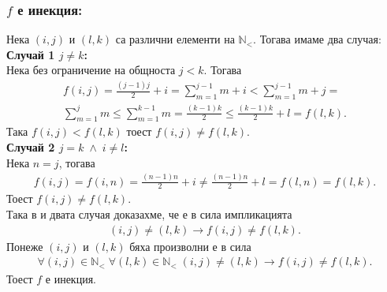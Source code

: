 \documentclass[a4paper, 12pt, oneside]{article}
\newcommand{\N}{\mathbb{N}}
\newcommand{\LN}{\N_<}
\begin{document}
\subsubsection*{\(f\) е инекция:}
Нека \((i, j)\) и \((l, k)\) са различни елементи на \(\LN\).
Тогава имаме два случая: \\
\textbf{Случай 1 \(j \neq k\):} \\
Нека без ограничение на общноста \(j < k\). Тогава
\begin{align*}
    f(i, j) = \displaystyle\frac{(j - 1)j}{2} + i = \displaystyle\sum_{m = 1}^{j - 1} m  + i < \displaystyle\sum_{m = 1}^{j - 1} m + j = \\
    \displaystyle\sum_{m = 1}^j m \leq \displaystyle\sum_{m = 1}^{k - 1} m = \displaystyle\frac{(k - 1)k}{2} \leq \displaystyle\frac{(k - 1)k}{2} + l = f(l, k).
\end{align*}
Така \(f(i, j) < f(l, k)\) тоест \(f(i, j) \neq f(l, k)\). \\
\textbf{Случай 2 \(j = k \; \land \; i \neq l\):} \\
Нека \(n = j\), тогава
\begin{align*}
    f(i, j) = f(i, n) = \displaystyle\frac{(n - 1)n}{2} + i \neq \displaystyle\frac{(n - 1)n}{2} + l = f(l, n) = f(l, k).
\end{align*}
Тоест \(f(i, j) \neq f(l, k)\). \\
Така в и двата случая доказахме, че е в сила импликацията
\begin{align*}
    (i, j) \neq (l, k) \longrightarrow f(i, j) \neq f(l, k).
\end{align*}
Понеже \((i, j)\) и \((l, k)\) бяха произволни е в сила
\begin{align*}
    \forall (i, j) \in \LN \; \forall (l, k) \in \LN \; (i, j) \neq (l, k) \longrightarrow f(i, j) \neq f(l, k).
\end{align*}
Тоест \(f\) е инекция.
\end{document}
